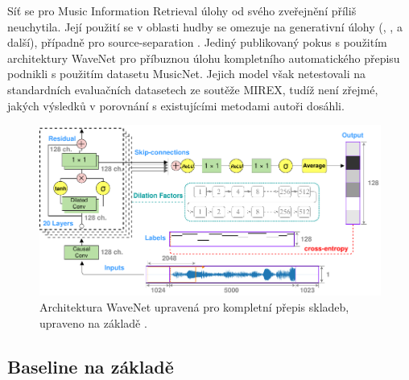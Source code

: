 Síť se pro Music Information Retrieval úlohy od svého zveřejnění příliš neuchytila. Její použití se v oblasti hudby se omezuje na generativní úlohy (\cite{Hawthorne2018a}, \cite{Yang2017}, \cite{Engel2017} a další), případně pro source-separation \citep{Stoller2018}. Jediný publikovaný pokus s použitím architektury WaveNet pro příbuznou úlohu kompletního automatického přepisu podnikli \cite{Martak2018} s použitím datasetu MusicNet. Jejich model však netestovali na standardních evaluačních datasetech ze soutěže MIREX, tudíž není zřejmé, jakých výsledků v porovnání s existujícími metodami autoři dosáhli.



\begin{figure}[h]\centering
\includegraphics[width=\textwidth,height=\textheight,keepaspectratio]{../img/wavenet_arch}
\caption{Architektura WaveNet upravená pro kompletní přepis skladeb, upraveno na základě \cite{Martak2018}.}
\label{obr:wavenet_arch}
\end{figure}

\subsection{Baseline na základě \cite{Martak2018}}



